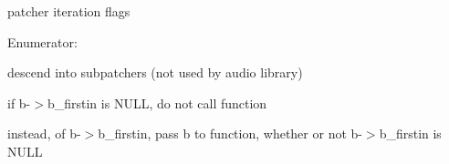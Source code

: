 patcher iteration flags \begin{Desc}
\item[Enumerator: ]\par
\begin{description}
\item[{\em 
\hypertarget{group__patcher_ggabc6126af1d45847bc59afa0aa3216b04a615ccc19640c4714e619315b94765e48}{
PI\_\-DEEP}
\label{group__patcher_ggabc6126af1d45847bc59afa0aa3216b04a615ccc19640c4714e619315b94765e48}
}]descend into subpatchers (not used by audio library) \item[{\em 
\hypertarget{group__patcher_ggabc6126af1d45847bc59afa0aa3216b04a4c42ad2b13496b1d6664fed514724ffa}{
PI\_\-REQUIREFIRSTIN}
\label{group__patcher_ggabc6126af1d45847bc59afa0aa3216b04a4c42ad2b13496b1d6664fed514724ffa}
}]if b-\/$>$b\_\-firstin is NULL, do not call function \item[{\em 
\hypertarget{group__patcher_ggabc6126af1d45847bc59afa0aa3216b04a128de369dd62c2625aff042d820456eb}{
PI\_\-WANTBOX}
\label{group__patcher_ggabc6126af1d45847bc59afa0aa3216b04a128de369dd62c2625aff042d820456eb}
}]instead, of b-\/$>$b\_\-firstin, pass b to function, whether or not b-\/$>$b\_\-firstin is NULL \end{description}
\end{Desc}

